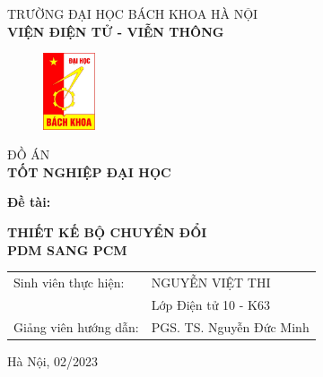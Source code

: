 \begin{titlepage}
\begin{center}
\vspace{-12pt}  TRƯỜNG ĐẠI HỌC BÁCH KHOA HÀ NỘI \\
\textbf{\fontsize{16pt}{0pt}\selectfont VIỆN ĐIỆN TỬ - VIỄN THÔNG}
\vspace{0.5cm}
 \begin{figure}[H]
     \centering
     \includegraphics[width=1.53cm,height=2.26cm]{Images/logodhbk.png}
 \end{figure}
\vspace{1.5cm}
\fontsize{24pt}{0pt}\selectfont ĐỒ ÁN\\
\vspace{12pt}
\textbf{\fontsize{32pt}{0pt}\selectfont TỐT NGHIỆP ĐẠI HỌC}
\vspace{1.5cm}
\end{center}
\hspace{6pt}\textbf{\fontsize{14pt}{0pt}\selectfont Đề tài:}
\begin{center}
    \textbf{\fontsize{20pt}{0pt}\selectfont THIẾT KẾ BỘ CHUYỂN ĐỔI}\\
    \vspace{0.3cm}
    \textbf{\fontsize{20pt}{0pt}\selectfont PDM SANG PCM}

\vspace{1.5cm}
\begin{table}[H]
    \centering
    \begin{tabular}{l l}
 \fontsize{14pt}{0pt}\selectfont Sinh viên thực hiện:    & \fontsize{14pt}{0pt}\selectfont NGUYỄN VIỆT THI \vspace{6pt} \\ 
     &\fontsize{14pt}{0pt}\selectfont Lớp Điện tử 10 - K63 \vspace{6pt}\\
\fontsize{14pt}{0pt}\selectfont Giảng viên hướng dẫn: & \fontsize{14pt}{0pt}\selectfont PGS. TS. Nguyễn Đức Minh
\end{tabular}
\end{table}
\vspace{3.5cm}
 \fontsize{14pt}{0pt}\selectfont Hà Nội, 02/2023
\end{center}
\end{titlepage}
\cleardoublepage
